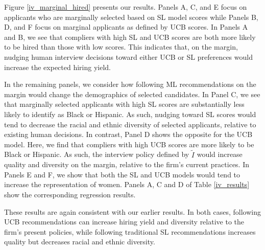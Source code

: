 \documentclass[crop,noquery,editorname,historyrev,nosurname,runningno,sepcount]{RESTUD}
\begin{document}
Figure \ref{iv_marginal_hired} presents our results.  Panels A, C, and E focus on applicants who are marginally selected based on SL model scores while Panels B, D, and F focus on marginal applicants as defined by UCB scores.  In Panels A and B, we see that compliers with high SL and UCB scores are both more likely to be hired than those with low scores.  This indicates that, on the margin, nudging human interview decisions toward either UCB or SL preferences would increase the expected hiring yield. 

In the remaining panels, we consider how following ML recommendations on the margin would change the demographics of selected candidates.  In Panel C, we see that marginally selected applicants with high SL scores are substantially less likely to identify as Black or Hispanic.  As such, nudging toward SL scores would tend to decrease the racial and ethnic diversity of selected applicants, relative to existing human decisions.  In contrast, Panel D shows the opposite for the UCB model. Here, we find that compliers with high UCB scores are more likely to be Black or Hispanic.  As such, the interview policy defined by $\tilde{I}$ would increase quality and diversity on the margin, relative to the firm's current practices.  In Panels E and F, we show that both the SL and UCB models would tend to increase the representation of women. Panels A, C and D of Table \ref{iv_results} show the corresponding regression results. 

These results are again consistent with our earlier results.  In both cases, following UCB recommendations can increase hiring yield and diversity relative to the firm's present policies, while following traditional SL recommendations increases quality but decreases racial and ethnic diversity.   
\end{document}
